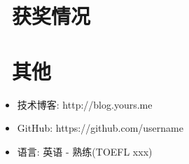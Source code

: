 \documentclass{resume}
\begin{document}
\section{\faHeartO\ 获奖情况}

\section{\faInfo\ 其他}
\begin{itemize}[parsep=0.5ex]
  \item 技术博客: http://blog.yours.me
  \item GitHub: https://github.com/username
  \item 语言: 英语 - 熟练(TOEFL xxx)
\end{itemize}

%
%
\end{document}
